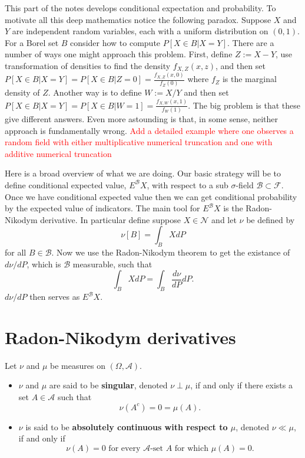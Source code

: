 


This part of the notes develops conditional expectation and probability. To motivate all this deep mathematics notice the following paradox. Suppose $X$ and $Y$ are independent random variables, each with a uniform distribution on $(0,1)$. For a Borel set $B$ consider how to compute $P[X\in B| X=Y]$. There are a number of ways one might approach this problem. First, define $Z := X-Y$,  use transformation of densities to find the density $f_{X, Z}(x,z)$, and then set $P[X\in B| X=Y]=P[X\in B| Z=0]=\frac{f_{X,Z}(x,0)}{f_Z(0)}$ where $f_Z$ is the marginal density of $Z$. Another way is to define $W := X/Y$ and then set $P[X\in B| X=Y]=P[X\in B| W=1]=\frac{f_{X,W}(x,1)}{f_W(1)}$. The big problem is that these give different answers. Even more astounding is that, in some sense, neither approach is fundamentally wrong.
\textcolor{red}{Add a detailed example where one observes a random field with either multiplicative numerical truncation and one with additive numerical truncation}


Here is a broad overview of what we are doing. Our basic strategy will be to define conditional expected value, $E^{\mathcal B}X$, with respect to a sub $\sigma$-field $\mathcal B \subset \mathcal F$. Once we have conditional expected value then we can get conditional probability by the expected value of indicators. The main tool for $E^{\mathcal B} X$ is the Radon-Nikodym derivative. In particular define suppose $X\in \mathscr N$ and let $\nu$ be defined by
\[ \nu[B] = \int_B X dP \]
for all $B\in \mathcal B$. Now we use the Radon-Nikodym theorem to get the existance of $d\nu/ dP$, which is $\mathcal B$ measurable, such that
\[ \int_B X dP = \int_B \frac{d\nu}{dP} dP. \]
$d\nu/ dP$ then serves as $E^{\mathcal B}X$.



%
%
\section{Radon-Nikodym derivatives}





\begin{definition}
Let $\nu$ and $\mu$ be measures on $(\Omega, \mathcal A)$.
\begin{itemize}
\item
$\nu$ and $\mu$ are said to be {\bf singular}, denoted $\nu \perp \mu$, if and only if there exists a set $A\in\mathcal A$ such that
\[
\nu(A^c) =0 = \mu(A).
\]
\item
$\nu$ is said to be {\bf absolutely continuous with respect to $\mu$}, denoted $\nu \ll \mu$, if and only if
\[\text{$\nu(A)=0$ for every $\mathcal A$-set $A$ for which $\mu(A)=0$.}  \]
\end{itemize}
\end{definition}

